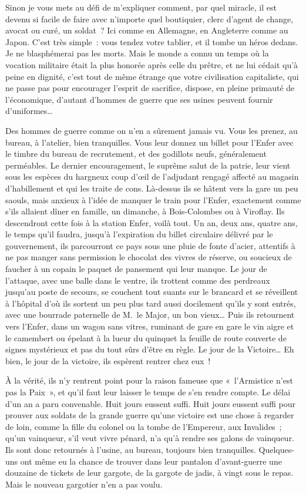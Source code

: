 \documentclass[french,twoside]{book} %
\begin{document}
Sinon je vous mets au défi de m’expliquer comment, par quel miracle, il est devenu si facile de faire avec n’importe quel boutiquier, clerc d’agent de change, avocat ou curé, un soldat ? Ici comme en Allemagne, en Angleterre comme au Japon. C’est très simple : vous tendez votre tablier, et il tombe un héros dedans. Je ne blasphémerai pas les morts. Mais le monde a connu un temps où la vocation militaire était la plus honorée après celle du prêtre, et ne lui cédait qu’à peine en dignité, c’est tout de même étrange que votre civilisation capitaliste, qui ne passe pas pour encourager l’esprit de sacrifice, dispose, en pleine primauté de l’économique, d’autant d’hommes de guerre que ses usines peuvent fournir d’uniformes…\par
Des hommes de guerre comme on n’en a sûrement jamais vu. Vous les prenez, au bureau, à l’atelier, bien tranquilles. Vous leur donnez un billet pour l’Enfer avec le timbre du bureau de recrutement, et des godillots neufs, généralement perméables. Le dernier encouragement, le suprême salut de la patrie, leur vient sous les espèces du hargneux coup d’œil de l’adjudant rengagé affecté au magasin d’habillement et qui les traite de cons. Là-dessus ils se hâtent vers la gare un peu saouls, mais anxieux à l’idée de manquer le train pour l’Enfer, exactement comme s’ils allaient dîner en famille, un dimanche, à Bois-Colombes ou à Viroflay. Ils descendront cette fois à la station Enfer, voilà tout. Un an, deux ans, quatre ans, le temps qu’il faudra, jusqu’à l’expiration du billet circulaire délivré par le gouvernement, ils parcourront ce pays sous une pluie de fonte d’acier, attentifs à ne pas manger sans permission le chocolat des vivres de réserve, ou soucieux de faucher à un copain le paquet de pansement qui leur manque. Le jour de l’attaque, avec une balle dans le ventre, ils trottent comme des perdreaux jusqu’au poste de secours, se couchent tout suants sur le brancard et se réveillent à l’hôpital d’où ils sortent un peu plus tard aussi docilement qu’ils y sont entrés, avec une bourrade paternelle de M. le Major, un bon vieux… Puis ils retournent vers l’Enfer, dans un wagon sans vitres, ruminant de gare en gare le vin aigre et le camembert ou épelant à la lueur du quinquet la feuille de route couverte de signes mystérieux et pas du tout sûrs d’être en règle. Le jour de la Victoire… Eh bien, le jour de la victoire, ils espèrent rentrer chez eux !\par
À la vérité, ils n’y rentrent point pour la raison fameuse que « l’Armistice n’est pas la Paix », et qu’il faut leur laisser le temps de s’en rendre compte. Le délai d’un an a paru convenable. Huit jours eussent suffi. Huit jours eussent suffi pour prouver aux soldats de la grande guerre qu’une victoire est une chose à regarder de loin, comme la fille du colonel ou la tombe de l’Empereur, aux Invalides ; qu’un vainqueur, s’il veut vivre pénard, n’a qu’à rendre ses galons de vainqueur. Ils sont donc retournés à l’usine, au bureau, toujours bien tranquilles. Quelques-uns ont même eu la chance de trouver dans leur pantalon d’avant-guerre une douzaine de tickets de leur gargote, de la gargote de jadis, à vingt sous le repas. Mais le nouveau gargotier n’en a pas voulu.\par
\end{document}
